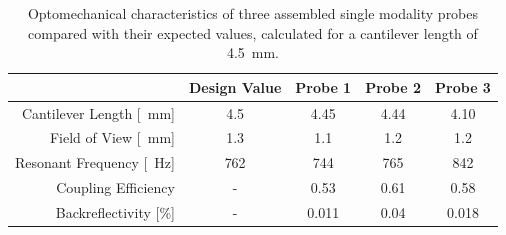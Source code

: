 \begin{table}[h!]\centering
\begin{tabular}{rcccc}
& 							\textbf{Design Value}&\textbf{Probe 1} & \textbf{Probe 2} & \textbf{Probe 3} \\ 
\hline
Cantilever Length [\SI{}{\milli\meter}] & 	4.5		& 	4.45 	& 	4.44	& 	4.10	\\
Field of View [\SI{}{\milli\meter}]		&	1.3		&	1.1	 	&	1.2 	& 	1.2  	\\ 
Resonant Frequency [\SI{}{\hertz}]  	&	762		& 	744		&	765 	& 	842 	\\ 
Coupling Efficiency  					&	-		& 	0.53	&	0.61 	&	0.58 	\\ 
Backreflectivity [\%] 					&	-		& 	0.011	&	0.04 	& 	0.018 	\\ 
\hline
\end{tabular} 
\caption{Optomechanical characteristics of three assembled single modality probes compared with their expected values, calculated for a cantilever length of \SI{4.5}{\milli\meter}.}
\label{tab:char}
\end{table}
